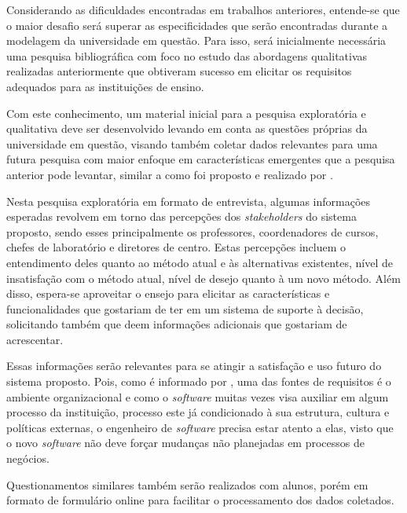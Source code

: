 Considerando as dificuldades encontradas em trabalhos anteriores, entende-se que o maior desafio será superar as especificidades que serão encontradas durante a modelagem da universidade em questão. Para isso, será inicialmente necessária uma pesquisa bibliográfica com foco no estudo das abordagens qualitativas realizadas anteriormente que obtiveram sucesso em elicitar os requisitos adequados para as instituições de ensino.


Com este conhecimento, um material inicial para a pesquisa exploratória e qualitativa deve ser desenvolvido levando em conta as questões próprias da universidade em questão, visando também coletar dados relevantes para uma futura pesquisa com maior enfoque em características emergentes que a pesquisa anterior pode levantar, similar a como foi proposto e realizado por .

Nesta pesquisa exploratória em formato de entrevista, algumas informações esperadas revolvem em torno das percepções dos \textit{stakeholders} do sistema proposto, sendo esses principalmente os professores, coordenadores de cursos, chefes de laboratório e diretores de centro. Estas percepções incluem o entendimento deles quanto ao método atual e às alternativas existentes, nível de insatisfação com o método atual, nível de desejo quanto à um novo método. Além disso, espera-se aproveitar o ensejo para elicitar as características e funcionalidades que gostariam de ter em um sistema de suporte à decisão, solicitando também que deem informações adicionais que gostariam de acrescentar.

Essas informações serão relevantes para se atingir a satisfação e uso futuro do sistema proposto. Pois, como é informado por , uma das fontes de requisitos é o ambiente organizacional e como o \textit{software} muitas vezes visa auxiliar em algum processo da instituição, processo este já condicionado à sua estrutura, cultura e políticas externas, o engenheiro de \textit{software} precisa estar atento a elas, visto que o novo \textit{software} não deve forçar mudanças não planejadas em processos de negócios.

Questionamentos similares também serão realizados com alunos, porém em formato de formulário online para facilitar o processamento dos dados coletados.

\def\LinkDrawio{https://www.drawio.com}
\def\LinkMermaid{https://mermaid.js.org}

